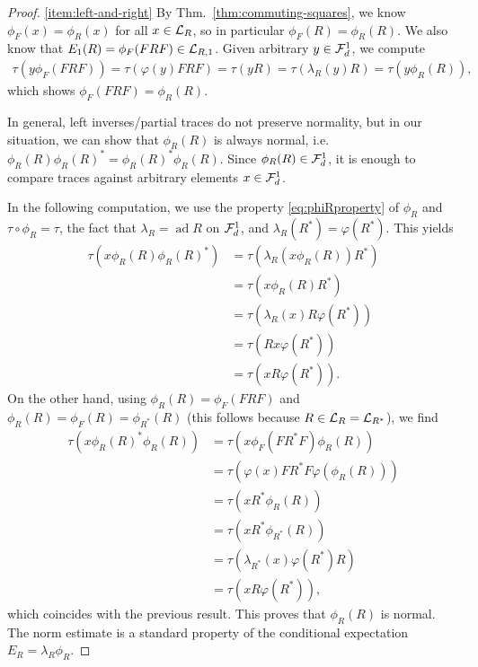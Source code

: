 \documentclass[12pt,a4paper]{amsart}
\numberwithin{equation}{section}
\theoremstyle{remark}
\DeclareMathOperator{\ad}{ad}
\newcommand{\la}{\lambda}
\begin{document}
\begin{proof}
    \ref{item:left-and-right} By Thm.~\ref{thm:commuting-squares}, we know $\phi_F(x)=\phi_R(x)$ for all $x\in\mathcal{L}_R$, so in particular $\phi_F(R)=\phi_R(R)$. We also know that $E_1(R)=\phi_F(FRF)\in\mathcal{L}_{R,1}$. Given arbitrary $y\in\mathcal{F}_d^1$, we compute
    \begin{align*}
        \tau(y\phi_F(FRF))
        =
        \tau(\varphi(y)FRF)
        =
        \tau(yR)
        =
        \tau(\la_R(y)R)
        =
        \tau(y\phi_R(R)),
    \end{align*}
    which shows $\phi_F(FRF)=\phi_R(R)$. 
    
    In general, left inverses/partial traces do not preserve normality, but in our situation, we can show that $\phi_R(R)$ is always normal, i.e. $\phi_R(R)\phi_R(R)^*=\phi_R(R)^*\phi_R(R)$. Since $\phi_R(R)\in\mathcal{F}_d^1$, it is enough to compare traces against arbitrary elements $x\in\mathcal{F}_d^1$.
    
    In the following computation, we use the property \eqref{eq:phiRproperty} of $\phi_R$ and $\tau\circ\phi_R=\tau$, the fact that $\la_R=\ad R$ on $\mathcal{F}_d^1$, and $\la_R(R^*)=\varphi(R^*)$. This yields    
    \begin{align*}
        \tau(x\phi_R(R)\phi_R(R)^*)
        &=
        \tau(\la_R(x\phi_R(R))R^*)
        \\
        &=
        \tau(x\phi_R(R)R^*)
        \\
        &=
        \tau(\la_R(x)R\varphi(R^*))
        \\
        &=
        \tau(Rx\varphi(R^*))
        \\
        &=
        \tau(xR\varphi(R^*)).
    \end{align*}
    On the other hand, using $\phi_R(R)=\phi_F(FRF)$ and $\phi_R(R)=\phi_F(R)=\phi_{R^*}(R)$ (this follows because $R\in\mathcal{L}_R=\mathcal{L}_{R^*}$), we find
    \begin{align*}
        \tau(x\phi_R(R)^*\phi_R(R))
        &=
        \tau(x\phi_F(FR^*F)\phi_R(R))
        \\
        &=
        \tau(\varphi(x)FR^*F\varphi(\phi_R(R)))
        \\
        &=
        \tau(xR^*\phi_R(R))
        \\
        &=
        \tau(xR^*\phi_{R^*}(R))
        \\
        &=
        \tau(\la_{R^*}(x)\varphi(R^*)R)
        \\
        &=
        \tau(xR\varphi(R^*)),
    \end{align*}
    which coincides with the previous result. This proves that $\phi_R(R)$ is normal. The norm estimate is a standard property of the conditional expectation $E_R=\la_R\phi_R$.


\end{proof}
\end{document}
